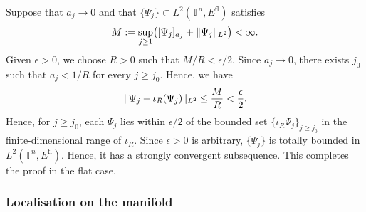 \documentclass[a4paper,oneside,12pt]{amsart}
\theoremstyle{plain}
\theoremstyle{definition}
\theoremstyle{remark}
\DeclarePairedDelimiter{\norm}{\lVert}{\rVert}
\DeclarePairedDelimiter{\seminorm}{\lbrack}{\rbrack}
\newcommand{\flattorus}{\mathbb{T}^n}
\newcommand{\Ltwonorm}[2][L^2]{\norm{#2}_{#1}}
\newcommand{\mesoscopicseminorm}[2][a]{\seminorm{#2}_{#1}}
\newcommand{\flatmodel}[1]{#1^{\mathrm{fl}}}
\begin{document}
Suppose that $a_j \to 0$ and that $\{\Psi_j\} \subset L^2(\flattorus,\flatmodel{E})$ satisfies
\begin{equation}
  M := \sup_{j \ge 1} \bigl( \mesoscopicseminorm[a_j]{\Psi_j} + \Ltwonorm{\Psi_j} \bigr) < \infty.
\end{equation}
Given $\epsilon > 0$, we choose $R > 0$ such that $M/R < \epsilon/2$.
Since $a_j \to 0$, there exists $j_0$ such that $a_j < 1/R$ for every $j \ge j_0$.
Hence, we have
\begin{equation}
  \Ltwonorm{\Psi_j - \iota_R(\Psi_j)} \le \frac{M}{R} < \frac{\epsilon}{2}.
\end{equation}
Hence, for $j \ge j_0$, each $\Psi_j$ lies within $\epsilon/2$ of the bounded set $\{\iota_R \Psi_j\}_{j \ge j_0}$ in the finite-dimensional range of $\iota_R$.
Since $\epsilon > 0$ is arbitrary, $\{\Psi_j\}$ is totally bounded in $L^2(\flattorus,\flatmodel{E})$.
Hence, it has a strongly convergent subsequence.
This completes the proof in the flat case.

\subsubsection{Localisation on the manifold}
\end{document}

